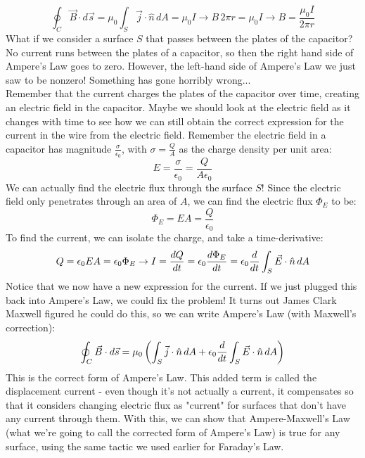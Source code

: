 \[
	\oint_C \vec B \cdot d\vec s = \mu_0 \int_S \vec j \cdot \hat n \, dA = \mu_0 I \rightarrow B \, 2\pi r = \mu_0 I \rightarrow B = \frac{\mu_0I}{2\pi r}
\]
What if we consider a surface $S$ that passes between the plates of the capacitor? No current runs between the plates of a capacitor, so then the right hand side of Ampere's Law goes to zero. However, the left-hand side of Ampere's Law we just saw to be nonzero! Something has gone horribly wrong...\\
Remember that the current charges the plates of the capacitor over time, creating an electric field in the capacitor. Maybe we should look at the electric field as it changes with time to see how we can still obtain the correct expression for the current in the wire from the electric field. Remember the electric field in a capacitor has magnitude $\frac{\sigma}{\epsilon_0}$, with $\sigma = \frac{Q}{A}$ as the charge density per unit area:
\[
	E = \frac{\sigma}{\epsilon_0} = \frac{Q}{A\epsilon_0}
\]
We can actually find the electric flux through the surface $S$! Since the electric field only penetrates through an area of $A$, we can find the electric flux $\Phi_E$ to be:
\[
	\Phi_E = EA = \frac{Q}{\epsilon_0}
\]
To find the current, we can isolate the charge, and take a time-derivative:
\[
	Q = \epsilon_0 EA = \epsilon_0 \Phi_E \rightarrow I = \frac{d Q}{d t} = \epsilon_0 \frac{d \Phi_E}{d t} = \epsilon_0 \frac{d }{d t} \int_S \vec E \cdot \hat n \, dA
\]
Notice that we now have a new expression for the current. If we just plugged this back into Ampere's Law, we could fix the problem! It turns out James Clark Maxwell figured he could do this, so we can write Ampere's Law (with Maxwell's correction):
\[
	\oint_C \vec B \cdot d\vec s = \mu_0 \left(\int_S \vec j \cdot \hat n \, dA + \epsilon_0  \frac{d }{d t} \int_S \vec E \cdot \hat n \, dA\right)
\]
This is the correct form of Ampere's Law. This added term is called the displacement current - even though it's not actually a current, it compensates so that it considers changing electric flux as "current" for surfaces that don't have any current through them. With this, we can show that Ampere-Maxwell's Law (what we're going to call the corrected form of Ampere's Law) is true for any surface, using the same tactic we used earlier for Faraday's Law. \\

